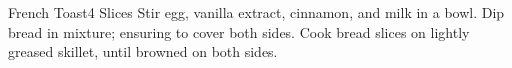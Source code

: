 \documentclass[../main.tex]{subfiles}
\begin{document}
\begin{recipe}{French Toast}{4 Slices}{}
    Stir egg, vanilla extract, cinnamon, and milk in a bowl.
    Dip bread in mixture; ensuring to cover both sides.
    Cook bread slices on lightly greased skillet, until browned on both sides.

\end{recipe}
\end{document}
